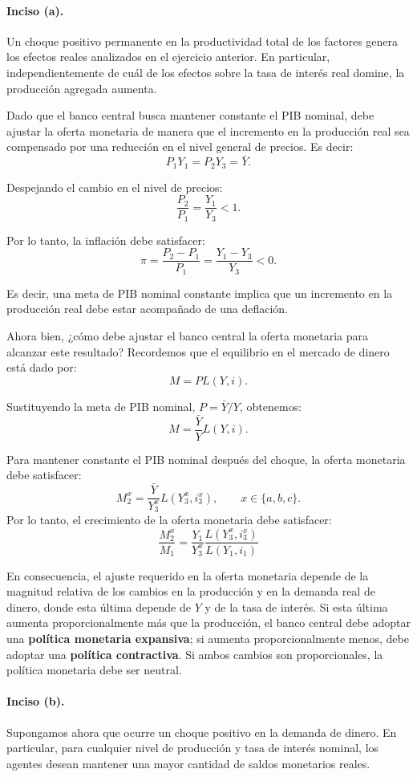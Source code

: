 \documentclass[11pt]{article}
\begin{document}
\paragraph{Inciso (a).} Un choque positivo permanente en la productividad total de los factores genera los efectos reales analizados en el ejercicio anterior. En particular, independientemente de cuál de los efectos sobre la tasa de interés real domine, la producción agregada aumenta.

Dado que el banco central busca mantener constante el PIB nominal, debe ajustar la oferta monetaria de manera que el incremento en la producción real sea compensado por una reducción en el nivel general de precios. Es decir:
\[
P_1Y_1=P_2Y_3=\bar Y.
\]

Despejando el cambio en el nivel de precios:
\[
\frac{P_2}{P_1}=\frac{Y_1}{Y_3}<1.
\]

Por lo tanto, la inflación debe satisfacer:
\[
\pi=\frac{P_2-P_1}{P_1}
=\frac{Y_1-Y_3}{Y_3}<0.
\]

Es decir, una meta de PIB nominal constante implica que un incremento en la producción real debe estar acompañado de una deflación.

Ahora bien, ¿cómo debe ajustar el banco central la oferta monetaria para alcanzar este resultado? Recordemos que el equilibrio en el mercado de dinero está dado por:
\[
M=PL(Y,i).
\]

Sustituyendo la meta de PIB nominal, $P=\bar Y/Y$, obtenemos:
\[
M=\frac{\bar Y}{Y}L(Y,i).
\]

Para mantener constante el PIB nominal después del choque, la oferta monetaria debe satisfacer:
\[
M_2^x=\frac{\bar Y}{Y_3^x}L(Y_3^x,i_3^x),
\qquad x\in\{a,b,c\}.
\]
Por lo tanto, el crecimiento de la oferta monetaria debe satisfacer:
\[
\frac{M_2^x}{M_1}
=
\frac{Y_1}{Y_3^x}
\frac{L(Y_3^x,i_3^x)}{L(Y_1,i_1)}
\]

En consecuencia, el ajuste requerido en la oferta monetaria depende de la magnitud relativa de los cambios en la producción y en la demanda real de dinero, donde esta última depende de $Y$ y de la tasa de interés. Si esta última aumenta proporcionalmente más que la producción, el banco central debe adoptar una \textbf{política monetaria expansiva}; si aumenta proporcionalmente menos, debe adoptar una \textbf{política contractiva}. Si ambos cambios son proporcionales, la política monetaria debe ser neutral.

\paragraph{Inciso (b).} Supongamos ahora que ocurre un choque positivo en la demanda de dinero. En particular, para cualquier nivel de producción y tasa de interés nominal, los agentes desean mantener una mayor cantidad de saldos monetarios reales.
\end{document}
